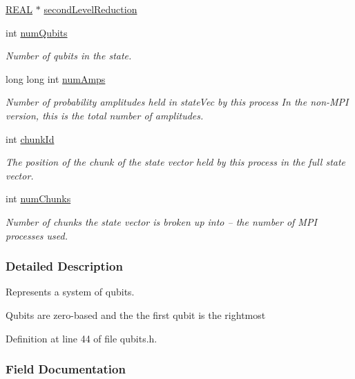 \begin{DoxyCompactItemize}
\mbox{\hyperlink{precision_8h_a4b654506f18b8bfd61ad2a29a7e38c25}{R\+E\+AL}} $\ast$ \mbox{\hyperlink{structMultiQubit_a3e859cefa146ec7b30464ab3d897930b}{second\+Level\+Reduction}}
\item 
int \mbox{\hyperlink{structMultiQubit_ab5b9795bdc6fb5855e1974dcbbaeb36f}{num\+Qubits}}
\begin{DoxyCompactList}\small\item\em Number of qubits in the state. \end{DoxyCompactList}\item 
long long int \mbox{\hyperlink{structMultiQubit_ae16f47d8b725c914fb7f66b6498d79db}{num\+Amps}}
\begin{DoxyCompactList}\small\item\em Number of probability amplitudes held in state\+Vec by this process In the non-\/\+M\+PI version, this is the total number of amplitudes. \end{DoxyCompactList}\item 
int \mbox{\hyperlink{structMultiQubit_ab10c88249fa3825d6227ceec01d37e37}{chunk\+Id}}
\begin{DoxyCompactList}\small\item\em The position of the chunk of the state vector held by this process in the full state vector. \end{DoxyCompactList}\item 
int \mbox{\hyperlink{structMultiQubit_acd43f2f57991709c9e94f73662c972b2}{num\+Chunks}}
\begin{DoxyCompactList}\small\item\em Number of chunks the state vector is broken up into -- the number of M\+PI processes used. \end{DoxyCompactList}\end{DoxyCompactItemize}


\subsubsection{Detailed Description}
Represents a system of qubits. 

Qubits are zero-\/based and the the first qubit is the rightmost 

Definition at line 44 of file qubits.\+h.



\subsubsection{Field Documentation}
\mbox{\label{structMultiQubit_ab10c88249fa3825d6227ceec01d37e37}} 
